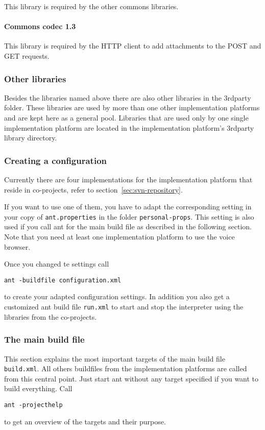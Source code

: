 \documentclass[11pt,a4paper]{article}
\begin{document}
This library is required by the other commons libraries.

\paragraph{Commons codec 1.3}
\label{sec:commons-logging}

This library is required by the HTTP client to add attachments to the POST and
GET requests.

\subsubsection{Other libraries}

Besides the libraries named above there are also other libraries in the
3rdparty folder. These libraries are used by more than one other implementation
platforms and are kept here as a general pool. Libraries that are used only by
one single implementation platform are located in the implementation platform's
3rdparty library directory.


\subsubsection{Creating a configuration}

Currently there are four implementations for the implementation platform
that reside in co-projects, refer to section~\ref{sec:svn-repository}.

If you want to use one of them, you have to adapt the corresponding setting
in your copy of \texttt{ant.properties} in the folder \texttt{personal-props}.
This setting is also used if you call ant for the main build file as described
in the following section.
Note that you need at least one implementation platform to use the voice
browser.

Once you changed te settings call
\begin{lstlisting}
ant -buildfile configuration.xml
\end{lstlisting}
to create your adapted configuration settings. In addition you also get
a customized ant build file \texttt{run.xml} to start and stop the interpreter
using the libraries from the co-projects.

\subsubsection{The main build file}
\label{sec:ant-build-file}

This section explains the most important targets of the main build file
\texttt{build.xml}. All others buildfiles from the implementation platforms
are called from this central point. Just start ant without any target specified
if you want to build everything. Call
\begin{lstlisting}
ant -projecthelp
\end{lstlisting}
to get an overview of the targets and their purpose.
\end{document}
